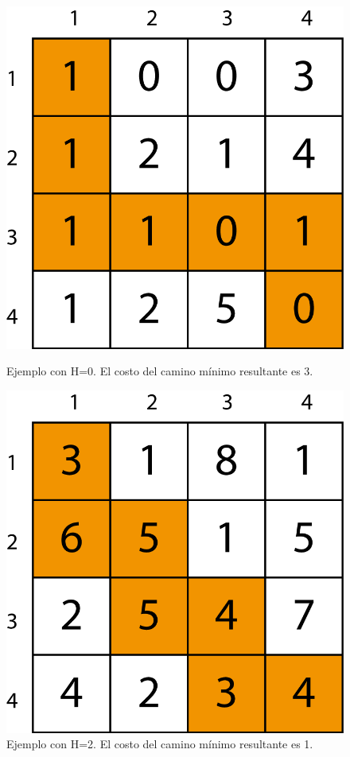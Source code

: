 \begin{figure}[H]
\centering
\begin{minipage}{0.3\textwidth}
  \centering
    \includegraphics[width=1\textwidth]{img/3-1.png}
  \caption*{\footnotesize Ejemplo con H=0. El costo del camino mínimo resultante es 3.}
  \label{fig:3-1}
\end{minipage}%
\hspace{0.2\textwidth}
\begin{minipage}{0.3\textwidth}   
  \centering
    \includegraphics[width=1\textwidth]{img/3-2.png} 
  \caption*{\footnotesize Ejemplo con H=2. El costo del camino mínimo resultante es 1.}
  \label{fig:3-2}
\end{minipage}
\end{figure}

